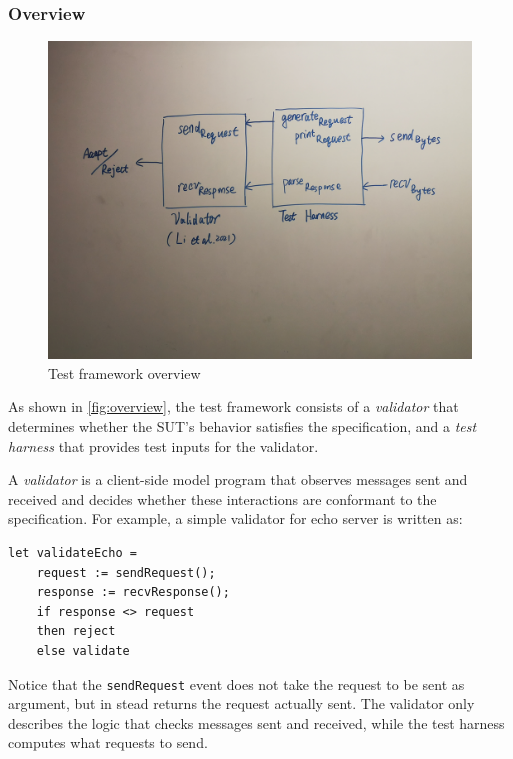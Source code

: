 \documentclass{article}
\newcommand{\ilc}[1]{\lstinline[style=customcoq]{#1}}
\theoremstyle{definition}
\begin{document}
\subsubsection{Overview}
\begin{figure}
  \centering
  \includegraphics[width=.9\textwidth]{figures/overview}
  \caption{Test framework overview}
  \label{fig:overview}
\end{figure}

As shown in \autoref{fig:overview}, the test framework consists of a {\em
  validator} that determines whether the SUT's behavior satisfies the
specification, and a {\em test harness} that provides test inputs for the
validator.

A {\em validator} is a client-side model program that observes messages sent and
received and decides whether these interactions are conformant to the
specification.  For example, a simple validator for echo server is written as:
\begin{lstlisting}[style=customcoq]
  let validateEcho =
    request := sendRequest();
    response := recvResponse();
    if response <> request
    then reject
    else validate
\end{lstlisting}
Notice that the \ilc{sendRequest} event does not take the request to be sent as
argument, but in stead returns the request actually sent.  The validator only
describes the logic that checks messages sent and received, while the test
harness computes what requests to send.
\end{document}
